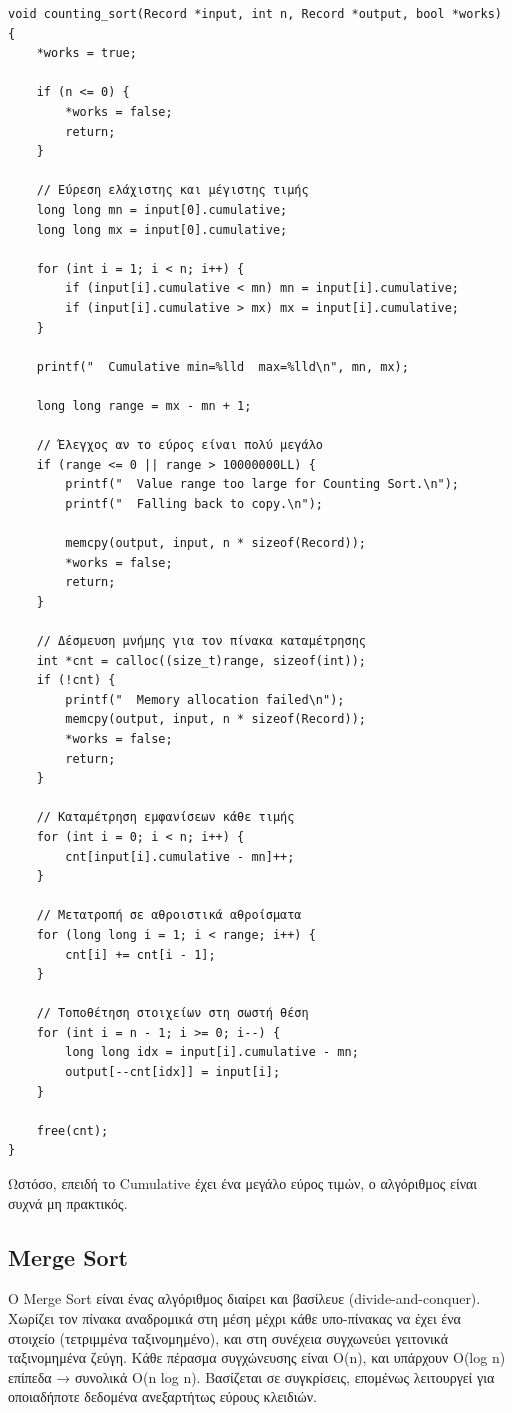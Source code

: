 \documentclass[a4paper,12pt]{article}
\begin{document}
	\begin{lstlisting}[caption=Counting Sort]
void counting_sort(Record *input, int n, Record *output, bool *works) {
	*works = true;
	
	if (n <= 0) {
		*works = false;
		return;
	}
	
	// Εύρεση ελάχιστης και μέγιστης τιμής
	long long mn = input[0].cumulative;
	long long mx = input[0].cumulative;
	
	for (int i = 1; i < n; i++) {
		if (input[i].cumulative < mn) mn = input[i].cumulative;
		if (input[i].cumulative > mx) mx = input[i].cumulative;
	}
	
	printf("  Cumulative min=%lld  max=%lld\n", mn, mx);
	
	long long range = mx - mn + 1;
	
	// Έλεγχος αν το εύρος είναι πολύ μεγάλο
	if (range <= 0 || range > 10000000LL) {
		printf("  Value range too large for Counting Sort.\n");
		printf("  Falling back to copy.\n");
		
		memcpy(output, input, n * sizeof(Record));
		*works = false;
		return;
	}
	
	// Δέσμευση μνήμης για τον πίνακα καταμέτρησης
	int *cnt = calloc((size_t)range, sizeof(int));
	if (!cnt) {
		printf("  Memory allocation failed\n");
		memcpy(output, input, n * sizeof(Record));
		*works = false;
		return;
	}
	
	// Καταμέτρηση εμφανίσεων κάθε τιμής
	for (int i = 0; i < n; i++) {
		cnt[input[i].cumulative - mn]++;
	}
	
	// Μετατροπή σε αθροιστικά αθροίσματα
	for (long long i = 1; i < range; i++) {
		cnt[i] += cnt[i - 1];
	}
	
	// Τοποθέτηση στοιχείων στη σωστή θέση
	for (int i = n - 1; i >= 0; i--) {
		long long idx = input[i].cumulative - mn;
		output[--cnt[idx]] = input[i];
	}
	
	free(cnt);
}
	\end{lstlisting}
	
	Ωστόσο, επειδή το Cumulative έχει ένα μεγάλο εύρος τιμών, ο αλγόριθμος είναι συχνά μη πρακτικός.
	
	\subsection{Merge Sort}
	
	Ο Merge Sort είναι ένας αλγόριθμος διαίρει και βασίλευε (divide-and-conquer). Χωρίζει τον πίνακα αναδρομικά στη μέση μέχρι κάθε υπο-πίνακας να έχει ένα στοιχείο (τετριμμένα ταξινομημένο), και στη συνέχεια συγχωνεύει γειτονικά ταξινομημένα ζεύγη. Κάθε πέρασμα συγχώνευσης είναι O(n), και υπάρχουν O(log n) επίπεδα → συνολικά O(n log n). Βασίζεται σε συγκρίσεις, επομένως λειτουργεί για οποιαδήποτε δεδομένα ανεξαρτήτως εύρους κλειδιών.
	
\end{document}
